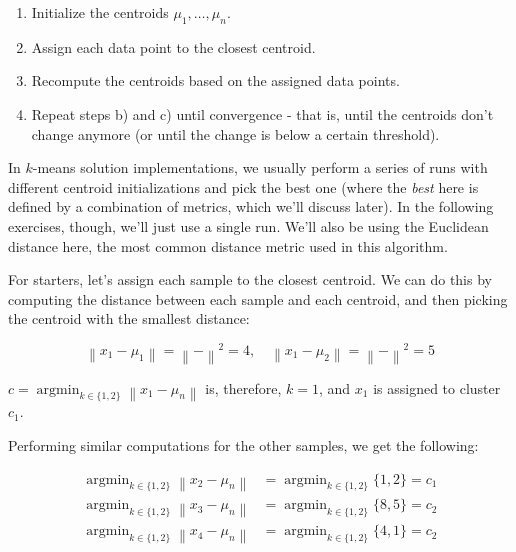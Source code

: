 \documentclass[12pt]{article}
\begin{document}
\begin{enumerate}[leftmargin=\labelsep]
  \begin{enumerate}
    \item Initialize the centroids $\mu_1, \ldots, \mu_n$.
    \item Assign each data point to the closest centroid.
    \item Recompute the centroids based on the assigned data points.
    \item Repeat steps b) and c) until convergence - that is, until the centroids don't change anymore
          (or until the change is below a certain threshold).
  \end{enumerate}

  In $k$-means solution implementations, we usually perform a series of runs with different
  centroid initializations and pick the best one (where the \textit{best} here
  is defined by a combination of metrics, which we'll discuss later). In the following
  exercises, though, we'll just use a single run. We'll also be using the Euclidean distance here,
  the most common distance metric used in this algorithm.

  For starters, let's assign each sample to the closest centroid. We can do this by computing
  the distance between each sample and each centroid, and then picking the centroid with the
  smallest distance:

  \begin{equation*}
    \left\| x_1 - \mu_1 \right\| = \left\|  -  \right\|^2 = 4, \quad
    \left\| x_1 - \mu_2 \right\| = \left\|  -  \right\|^2 = 5
  \end{equation*}

  $c = \operatorname{argmin}_{k \in \{1, 2\}} \left\| x_1 - \mu_n \right\|$ is, therefore, $k = 1$,
  and $x_1$ is assigned to cluster $c_1$.

  Performing similar computations for the other samples, we get the following:

  \begin{equation*}
    \begin{aligned}
      \operatorname{argmin}_{k \in \{1, 2\}} \left\| x_2 - \mu_n \right\| & = \operatorname{argmin}_{k \in \{1, 2\}} \{1, 2\} = c_1 \\
      \operatorname{argmin}_{k \in \{1, 2\}} \left\| x_3 - \mu_n \right\| & = \operatorname{argmin}_{k \in \{1, 2\}} \{8, 5\} = c_2 \\
      \operatorname{argmin}_{k \in \{1, 2\}} \left\| x_4 - \mu_n \right\| & = \operatorname{argmin}_{k \in \{1, 2\}} \{4, 1\} = c_2
    \end{aligned}
  \end{equation*}


\end{enumerate}
\end{document}
